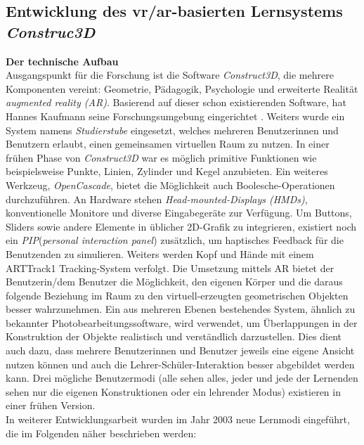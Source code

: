 \documentclass[deutsch]{llncs}
\begin{document}
\subsection{Entwicklung des vr/ar-basierten Lernsystems \emph{Construc3D} }
\textbf{Der technische Aufbau} \\
Ausgangspunkt für die Forschung ist die Software \emph{Construct3D}, die mehrere Komponenten vereint: Geometrie, Pädagogik, Psychologie und erweiterte Realität \emph{augmented reality (AR)}.
Basierend auf dieser schon existierenden Software, hat Hannes Kaufmann seine Forschungsumgebung eingerichtet \cite{Kaufmann:2002:MGE:1242073.1242086}. 
Weiters wurde ein System namens \emph{Studierstube} eingesetzt, welches mehreren Benutzerinnen und Benutzern erlaubt, einen gemeinsamen virtuellen Raum zu nutzen.
In einer frühen Phase von \emph{Construct3D} war es möglich primitive Funktionen wie beispielsweise Punkte, Linien, Zylinder und Kegel anzubieten.
Ein weiteres Werkzeug, \emph{OpenCascade}, bietet die Möglichkeit auch Boolesche-Operationen durchzuführen.
An Hardware stehen \emph{Head-mounted-Displays (HMDs)}, konventionelle Monitore und diverse Eingabegeräte zur Verfügung. Um Buttons, Sliders sowie andere Elemente in üblicher 2D-Grafik zu integrieren, existiert noch ein \emph{PIP}(\emph{personal interaction panel})  zusätzlich, um haptisches Feedback für die Benutzenden zu simulieren. Weiters werden Kopf und Hände mit einem ARTTrack1 Tracking-System verfolgt.
Die Umsetzung mittels AR bietet der Benutzerin/dem Benutzer die Möglichkeit, den eigenen Körper und die daraus folgende Beziehung im Raum zu den virtuell-erzeugten geometrischen Objekten besser wahrzunehmen. 
Ein aus mehreren Ebenen bestehendes System, ähnlich zu bekannter Photobearbeitungssoftware, wird verwendet, um Überlappungen in der Konstruktion der Objekte realistisch und verständlich darzustellen. Dies dient auch dazu, dass mehrere Benutzerinnen und Benutzer jeweils eine eigene Ansicht nutzen können und auch die Lehrer-Schüler-Interaktion besser abgebildet werden kann. 
Drei mögliche Benutzermodi (alle sehen alles, jeder und jede der Lernenden sehen nur die eigenen Konstruktionen oder ein lehrender Modus) existieren in einer frühen Version. \\
In weiterer Entwicklungsarbeit wurden im Jahr 2003 neue Lernmodi eingeführt, die im Folgenden näher beschrieben werden:
 \\
\end{document}
